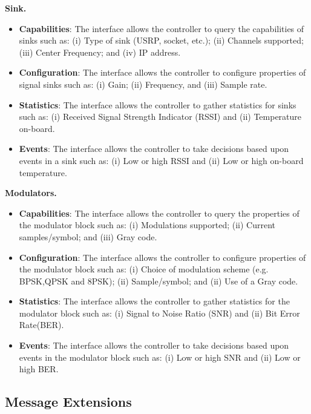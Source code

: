 \textbf{Sink.}
\begin{itemize}
\item \textbf{Capabilities}: The interface allows the controller to query the capabilities of sinks such as:
    (i)  Type of sink (USRP, socket, etc.);
    (ii) Channels supported;
    (iii) Center Frequency; and
    (iv) IP address.
\item \textbf{Configuration}: The interface allows the controller to configure properties of signal sinks such as:
    (i) Gain;
    (ii) Frequency, and
    (iii) Sample rate.
\item \textbf{Statistics}: The interface allows the controller to gather statistics for sinks such as:
    (i) Received Signal Strength Indicator (RSSI) and
    (ii) Temperature on-board.
\item \textbf{Events}: The interface allows the controller to take decisions based upon events in a sink such as:
    (i) Low or high RSSI and
    (ii) Low or high on-board temperature.
\end{itemize}

\textbf{Modulators.}
\begin{itemize}
\item \textbf{Capabilities}: The interface allows the controller to query the properties of the modulator block such as:
    (i) Modulations supported;
    (ii) Current samples/symbol; and
    (iii) Gray code.
\item \textbf{Configuration}: The interface allows the controller to configure properties of the modulator block such as:
    (i) Choice of modulation scheme (e.g. BPSK,QPSK and 8PSK);
    (ii) Sample/symbol; and
    (ii) Use of a Gray code.
\item \textbf{Statistics}: The interface allows the controller to gather statistics for the modulator block such as:
    (i) Signal to Noise Ratio (SNR) and
    (ii) Bit Error Rate(BER).
\item \textbf{Events}: The interface allows the controller to take decisions based upon events in the modulator block such as:
    (i) Low or high SNR and
    (ii) Low or high BER.
\end{itemize}

\subsection{Message Extensions}
\label{sec:messages}
  		  

